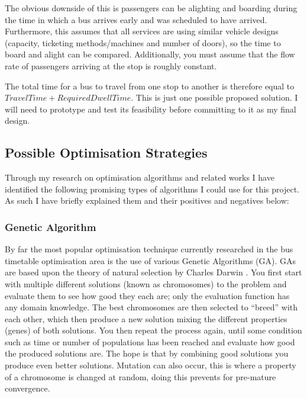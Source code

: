 \documentclass{article}
\begin{document}
\par 
The obvious downside of this is passengers can be alighting and boarding during the time in which a bus arrives early and was scheduled to have arrived. Furthermore, this assumes that all services are using similar vehicle designs (capacity, ticketing methods/machines and number of doors), so the time to board and alight can be compared. Additionally, you must assume that the flow rate of passengers arriving at the stop is roughly constant.

\par 

The total time for a bus to travel from one stop to another is therefore equal to \( Travel Time + Required Dwell Time\). This is just one possible proposed solution. I will need to prototype and test its feasibility before committing to it as my final design.





\subsection{Possible Optimisation Strategies}
Through my research on optimisation algorithms and related works I have identified the following promising types of algorithms I could use for this project. As such I have briefly explained them and their positives and negatives below:

\subsubsection{Genetic Algorithm}
By far the most popular optimisation technique currently researched in the bus timetable optimisation area is the use of various Genetic Algorithms (GA). GAs are based upon the theory of natural selection by Charles Darwin \cite{RN35}. You first start with multiple different solutions (known as chromosomes) to the problem and evaluate them to see how good they each are; only the evaluation function has any domain knowledge. The best chromosomes are then selected to ``breed'' with each other, which then produce a new solution mixing the different properties (genes) of both solutions. You then repeat the process again, until some condition such as time or number of populations has been reached and evaluate how good the produced solutions are. The hope is that by combining good solutions you produce even better solutions. Mutation can also occur, this is where a property of a chromosome is changed at random, doing this prevents for pre-mature convergence.
\end{document}
